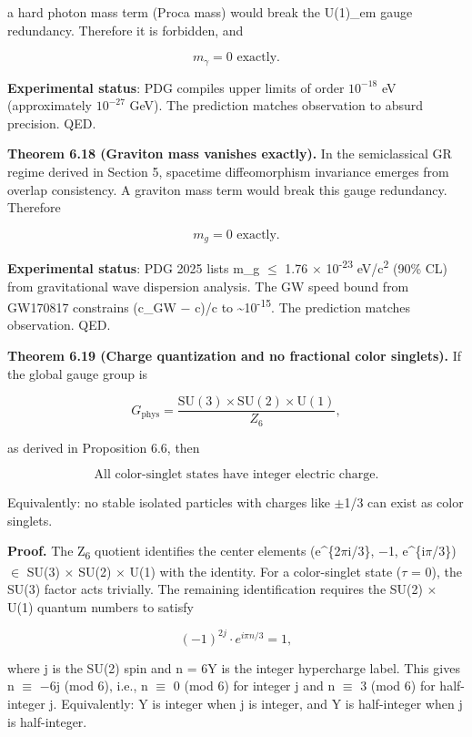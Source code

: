 \documentclass[11pt,a4paper]{article}
\theoremstyle{remark}
\begin{document}
a hard photon mass term (Proca mass) would break the U(1)\_em gauge
redundancy. Therefore it is forbidden, and

\[
m_\gamma = 0 \text{ exactly.}
\]

\textbf{Experimental status}: PDG compiles upper limits of order \(10^{-18}\) eV
(approximately \(10^{-27}\) GeV). The prediction matches observation to absurd
precision. QED.

\textbf{Theorem 6.18 (Graviton mass vanishes exactly).} In the semiclassical GR
regime derived in Section 5, spacetime diffeomorphism invariance emerges
from overlap consistency. A graviton mass term would break this gauge
redundancy. Therefore

\[
m_g = 0 \text{ exactly.}
\]

\textbf{Experimental status}: PDG 2025 lists m\_g \ensuremath{\leq} 1.76 \ensuremath{\times} 10\textsuperscript{-23}
eV/c\textsuperscript{2} (90\% CL) from gravitational wave dispersion analysis. The GW speed
bound from GW170817 constrains (c\_GW \ensuremath{-} c)/c to \textasciitilde10\textsuperscript{-15}. The
prediction matches observation. QED.

\textbf{Theorem 6.19 (Charge quantization and no fractional color singlets).} If
the global gauge group is

\[
G_{\mathrm{phys}} = \frac{\mathrm{SU}(3) \times \mathrm{SU}(2) \times \mathrm{U}(1)}{Z_6},
\]

as derived in Proposition 6.6, then

\[
\text{All color-singlet states have integer electric charge.}
\]

Equivalently: no stable isolated particles with charges like \ensuremath{\pm}1/3 can
exist as color singlets.

\textbf{Proof.} The Z\textsubscript{6} quotient identifies the center elements
(e\^{}\{2\ensuremath{\pi}i/3\}, \ensuremath{-}1, e\^{}\{i\ensuremath{\pi}/3\}) \ensuremath{\in} SU(3) \ensuremath{\times} SU(2) \ensuremath{\times} U(1)
with the identity. For a color-singlet state (\ensuremath{\tau} = 0), the SU(3) factor acts
trivially. The remaining identification requires the SU(2) \ensuremath{\times} U(1)
quantum numbers to satisfy

\[
(-1)^{2j} \cdot e^{i\pi n/3} = 1,
\]

where j is the SU(2) spin and n = 6Y is the integer hypercharge label.
This gives n \ensuremath{\equiv} \ensuremath{-}6j (mod 6), i.e., n \ensuremath{\equiv} 0 (mod 6) for integer j and
n \ensuremath{\equiv} 3 (mod 6) for half-integer j. Equivalently: Y is integer when j is
integer, and Y is half-integer when j is half-integer.
\end{document}
